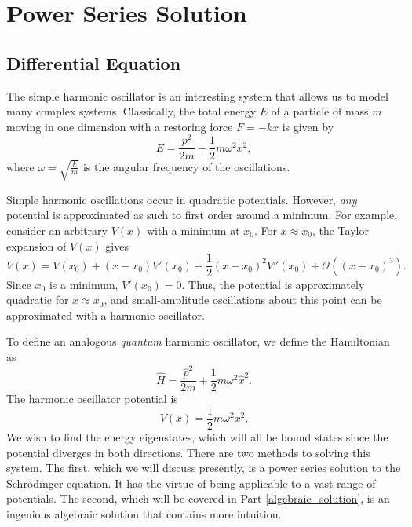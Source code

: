 \section{Power Series Solution}\label{power_series_solution}
\subsection{Differential Equation}\label{diff_eq_harmonic_oscillator}

The simple harmonic oscillator is an interesting system that allows us to model many complex systems. Classically, the total energy $E$ of a particle of mass $m$ moving in one dimension with a restoring force $F=-kx$ is given by $$E=\frac{p^2}{2m}+\frac{1}{2}m\omega^2x^2,$$where $\omega=\sqrt{\frac{k}{m}}$ is the angular frequency of the oscillations.

\begin{framedrmk*}
    Simple harmonic oscillations occur in quadratic potentials. However, \textit{any} potential is approximated as such to first order around a minimum. For example, consider an arbitrary $V(x)$ with a minimum at $x_0$. For $x\approx x_0$, the Taylor expansion of $V(x)$ gives $$V(x)=V(x_0)+(x-x_0)V'(x_0)+\frac{1}{2}(x-x_0)^2V''(x_0)+\mathcal{O}((x-x_0)^3).$$Since $x_0$ is a minimum, $V'(x_0)=0$. Thus, the potential is approximately quadratic for $x\approx x_0$, and small-amplitude oscillations about this point can be approximated with a harmonic oscillator.
\end{framedrmk*}

To define an analogous \textit{quantum} harmonic oscillator, we define the Hamiltonian as $$\hat{H}=\frac{\hat{p}^2}{2m}+\frac{1}{2}m\omega^2\hat{x}^2.$$The harmonic oscillator potential is $$V(x)=\frac{1}{2}m\omega^2x^2.$$We wish to find the energy eigenstates, which will all be bound states since the potential diverges in both directions. There are two methods to solving this system. The first, which we will discuss presently, is a power series solution to the Schrödinger equation. It has the virtue of being applicable to a vast range of potentials. The second, which will be covered in Part \ref{algebraic_solution}, is an ingenious algebraic solution that contains more intuition.

